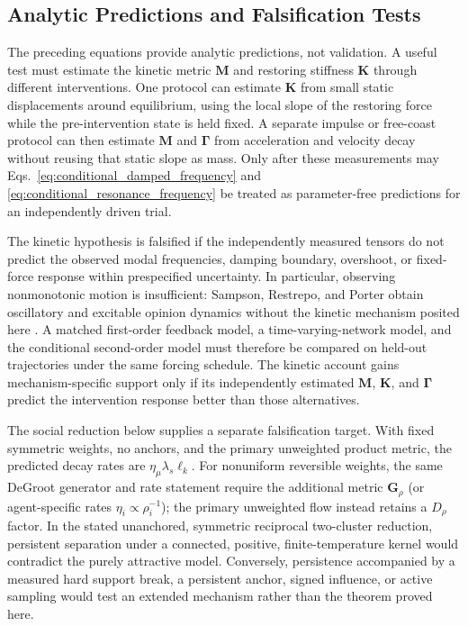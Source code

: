 \documentclass[12pt]{article}
\begin{document}
\subsection{Analytic Predictions and Falsification Tests}
\label{sec:computational_validation}

The preceding equations provide analytic predictions, not validation.  A useful test must estimate the kinetic metric $\mathbf M$ and restoring stiffness $\mathbf K$ through different interventions.  One protocol can estimate $\mathbf K$ from small static displacements around equilibrium, using the local slope of the restoring force while the pre-intervention state is held fixed.  A separate impulse or free-coast protocol can then estimate $\mathbf M$ and $\boldsymbol\Gamma$ from acceleration and velocity decay without reusing that static slope as mass.  Only after these measurements may Eqs.~\eqref{eq:conditional_damped_frequency} and \eqref{eq:conditional_resonance_frequency} be treated as parameter-free predictions for an independently driven trial.

The kinetic hypothesis is falsified if the independently measured tensors do not predict the observed modal frequencies, damping boundary, overshoot, or fixed-force response within prespecified uncertainty.  In particular, observing nonmonotonic motion is insufficient: Sampson, Restrepo, and Porter obtain oscillatory and excitable opinion dynamics without the kinetic mechanism posited here \citep{SampsonPorterRestrepo2025}.  A matched first-order feedback model, a time-varying-network model, and the conditional second-order model must therefore be compared on held-out trajectories under the same forcing schedule.  The kinetic account gains mechanism-specific support only if its independently estimated $\mathbf M$, $\mathbf K$, and $\boldsymbol\Gamma$ predict the intervention response better than those alternatives.

The social reduction below supplies a separate falsification target.  With fixed symmetric weights, no anchors, and the primary unweighted product metric, the predicted decay rates are $\eta_\mu\lambda_s\ell_k$.  For nonuniform reversible weights, the same DeGroot generator and rate statement require the additional metric $\mathbf G_\rho$ (or agent-specific rates $\eta_i\propto\rho_i^{-1}$); the primary unweighted flow instead retains a $D_\rho$ factor.  In the stated unanchored, symmetric reciprocal two-cluster reduction, persistent separation under a connected, positive, finite-temperature kernel would contradict the purely attractive model.  Conversely, persistence accompanied by a measured hard support break, a persistent anchor, signed influence, or active sampling would test an extended mechanism rather than the theorem proved here.
\end{document}

